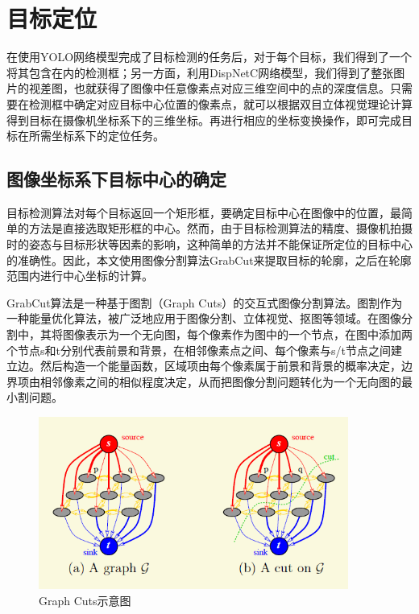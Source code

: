 \section{目标定位}
在使用YOLO网络模型完成了目标检测的任务后，对于每个目标，我们得到了一个将其包含在内的检测框；另一方面，利用DispNetC网络模型，我们得到了整张图片的视差图，也就获得了图像中任意像素点对应三维空间中的点的深度信息。只需要在检测框中确定对应目标中心位置的像素点，就可以根据双目立体视觉理论计算得到目标在摄像机坐标系下的三维坐标。再进行相应的坐标变换操作，即可完成目标在所需坐标系下的定位任务。


\subsection{图像坐标系下目标中心的确定}
目标检测算法对每个目标返回一个矩形框，要确定目标中心在图像中的位置，最简单的方法是直接选取矩形框的中心。然而，由于目标检测算法的精度、摄像机拍摄时的姿态与目标形状等因素的影响，这种简单的方法并不能保证所定位的目标中心的准确性。因此，本文使用图像分割算法GrabCut来提取目标的轮廓，之后在轮廓范围内进行中心坐标的计算。

GrabCut算法\cite{rother2004grabcut}是一种基于图割（Graph Cuts）\cite{boykov2001interactive}的交互式图像分割算法。图割作为一种能量优化算法，被广泛地应用于图像分割、立体视觉、抠图等领域。在图像分割中，其将图像表示为一个无向图，每个像素作为图中的一个节点，在图中添加两个节点s和t分别代表前景和背景，在相邻像素点之间、每个像素与s/t节点之间建立边。然后构造一个能量函数，区域项由每个像素属于前景和背景的概率决定，边界项由相邻像素之间的相似程度决定，从而把图像分割问题转化为一个无向图的最小割问题。

\begin{figure}[htb] %
	\centering
	\includegraphics[width=4in]{figures/5_2_graphcuts}
	\caption{Graph Cuts示意图}\label{fig:5_1_Graph Cuts示意图}
\end{figure}

